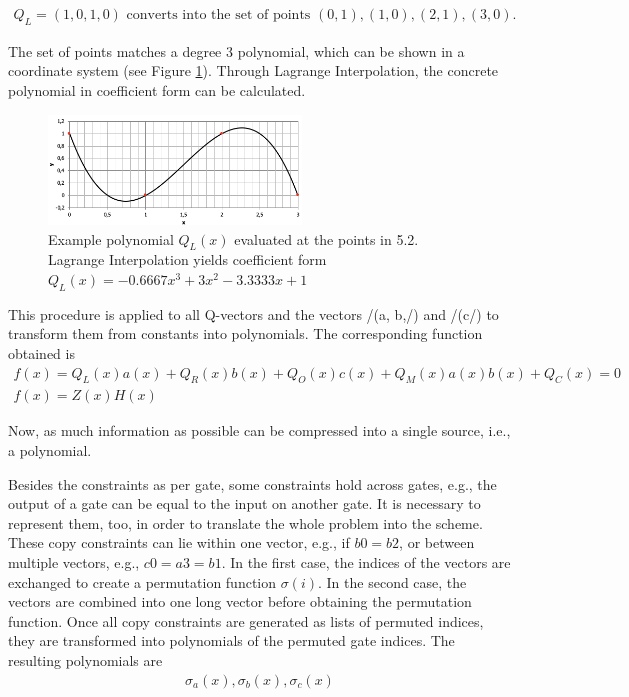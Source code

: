 \begin{align}
    Q_L = (1,0,1,0) \text{ converts into the set of points } {(0,1), (1,0), (2,1), (3,0)}.
\end{align}

The set of points matches a degree 3 polynomial, which can be shown in a coordinate system (see Figure \ref{fig:examplepoly}). Through Lagrange Interpolation, the concrete polynomial in coefficient form can be calculated. 
\begin{figure}[hbt]
	\centering
	\includegraphics[width=0.6\textwidth]{Pictures/example_polynomial.png}
	\caption{Example polynomial \(Q_{L}(x)\) evaluated at the points in 5.2. Lagrange Interpolation yields coefficient form \(Q_{L}(x) = - 0.6667x^3 + 3x^2 - 3.3333x + 1\)}
	\label{fig:examplepoly}
\end{figure}

This procedure is applied to all Q-vectors and the vectors /(a, b,/) and /(c/) to transform them from constants into polynomials. The corresponding function obtained is
\begin{align}
    f(x) = Q_{L}(x)a(x) + Q_{R}(x)b(x) + Q_{O}(x)c(x) + Q_{M}(x)a(x)b(x) + Q_{C}(x) = 0\\
    f(x) = Z(x)H(x)
\end{align}

Now, as much information as possible can be compressed into a single source, i.e., a polynomial. 

Besides the constraints as per gate, some constraints hold across gates, e.g., the output of a gate can be equal to the input on another gate. It is necessary to represent them, too, in order to translate the whole problem into the scheme. These copy constraints can lie within one vector, e.g., if \(b0 = b2\), or between multiple vectors, e.g., \(c0 = a3 = b1\). In the first case, the indices of the vectors are exchanged to create a permutation function \(\sigma(i)\). In the second case, the vectors are combined into one long vector before obtaining the permutation function. Once all copy constraints are generated as lists of permuted indices, they are transformed into polynomials of the permuted gate indices. The resulting polynomials are
\begin{align}
    \sigma_{a}(x), \sigma_{b}(x), \sigma_{c}(x)
\end{align}

